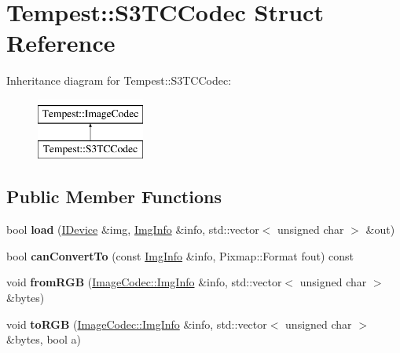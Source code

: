 \hypertarget{struct_tempest_1_1_s3_t_c_codec}{\section{Tempest\+:\+:S3\+T\+C\+Codec Struct Reference}
\label{struct_tempest_1_1_s3_t_c_codec}
}
Inheritance diagram for Tempest\+:\+:S3\+T\+C\+Codec\+:\begin{figure}[H]
\begin{center}
\leavevmode
\includegraphics[height=2.000000cm]{struct_tempest_1_1_s3_t_c_codec}
\end{center}
\end{figure}
\subsection*{Public Member Functions}
\begin{DoxyCompactItemize}
\item 
\hypertarget{struct_tempest_1_1_s3_t_c_codec_a9a16e6f11ad268251bbfe6d512d04f65}{bool {\bfseries load} (\hyperlink{class_tempest_1_1_i_device}{I\+Device} \&img, \hyperlink{struct_tempest_1_1_pixmap_1_1_img_info}{Img\+Info} \&info, std\+::vector$<$ unsigned char $>$ \&out)}\label{struct_tempest_1_1_s3_t_c_codec_a9a16e6f11ad268251bbfe6d512d04f65}

\item 
\hypertarget{struct_tempest_1_1_s3_t_c_codec_a815652fe13ed76c4676d88877941fe09}{bool {\bfseries can\+Convert\+To} (const \hyperlink{struct_tempest_1_1_pixmap_1_1_img_info}{Img\+Info} \&info, Pixmap\+::\+Format fout) const }\label{struct_tempest_1_1_s3_t_c_codec_a815652fe13ed76c4676d88877941fe09}

\item 
\hypertarget{struct_tempest_1_1_s3_t_c_codec_a9f8da45965e837a9631a3316e9fd92ea}{void {\bfseries from\+R\+G\+B} (\hyperlink{struct_tempest_1_1_pixmap_1_1_img_info}{Image\+Codec\+::\+Img\+Info} \&info, std\+::vector$<$ unsigned char $>$ \&bytes)}\label{struct_tempest_1_1_s3_t_c_codec_a9f8da45965e837a9631a3316e9fd92ea}

\item 
\hypertarget{struct_tempest_1_1_s3_t_c_codec_ad62fa39c8f9835f37857c0c57edf8538}{void {\bfseries to\+R\+G\+B} (\hyperlink{struct_tempest_1_1_pixmap_1_1_img_info}{Image\+Codec\+::\+Img\+Info} \&info, std\+::vector$<$ unsigned char $>$ \&bytes, bool a)}\label{struct_tempest_1_1_s3_t_c_codec_ad62fa39c8f9835f37857c0c57edf8538}

\end{DoxyCompactItemize}
